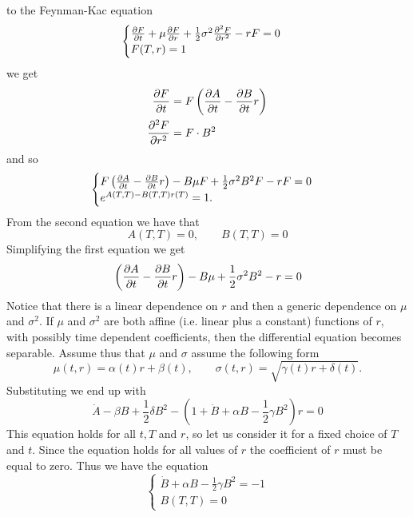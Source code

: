 to the Feynman-Kac equation
\begin{align*}
    \begin{cases}
    \pdv{F}{t} + \mu \pdv{F}{r} + \frac{1}{2}\sigma^2\pdv[2]{F}{r} - rF = 0 \\
    F(T,r) = 1
    \end{cases}
\end{align*}
we get
\begin{align*}
    \pdv{F}{t} &= F\left(\pdv{A}{t} - \pdv{B}{t}r\right) \\
    \pdv[2]{F}{r} &= F\cdot B^2
\end{align*}
and so
\begin{align*}
    \begin{cases}
    F\left(\pdv{A}{t} - \pdv{B}{t}r\right) - B\mu F + \frac{1}{2}\sigma^2 B^2F -rF = 0 \\
    e^{A(T,T)-B(T,T)r(T)} = 1.
    \end{cases}
\end{align*}
From the second equation we have that
\begin{equation}
        A(T,T) = 0, \qquad B(T,T) = 0
\end{equation}
Simplifying the first equation we get
\begin{equation*}
    \left(\pdv{A}{t} - \pdv{B}{t}r\right) - B\mu + \frac{1}{2}\sigma^2 B^2 -r = 0
\end{equation*}
Notice that there is a linear dependence on $r$ and then a generic dependence on $\mu$ and $\sigma^2$. If $\mu$ and $\sigma^2$ are both affine (i.e. linear plus a constant) functions of $r$, with possibly time dependent coefficients, then the differential equation becomes separable.
Assume thus that $\mu$ and $\sigma$ assume the following form
\begin{equation*}
    \mu(t,r) = \alpha(t)r + \beta(t), \qquad \sigma(t,r) = \sqrt{\gamma(t)r + \delta(t)}.
\end{equation*}
Substituting we end up with
\begin{equation*}
    \dot{A} - \beta B + \frac{1}{2}\delta B^2 - \left(1+\dot{B} + \alpha B - \frac{1}{2}\gamma B^2\right)r = 0
\end{equation*}
This equation holds for all $t, T$ and $r$, so let us consider it for a fixed choice of $T$ and $t$. Since the equation holds for all values of $r$ the coefficient of $r$ must be equal to zero. Thus we have the equation
\begin{equation}\label{Aeq}
    \begin{cases}
        \dot{B} + \alpha B - \frac{1}{2}\gamma B^2 = -1 \\
        B(T,T) = 0
    \end{cases}
\end{equation}
